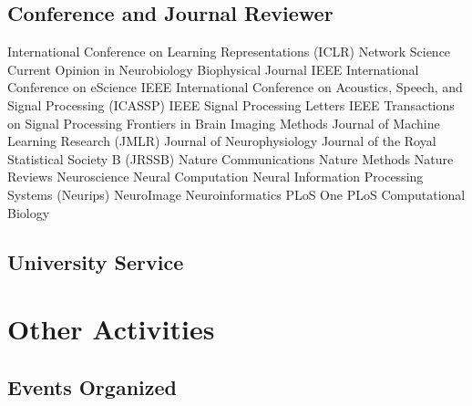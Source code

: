 \documentclass[10pt,colorlinks=true,urlcolor=blue]{moderncv}
\begin{document}
\subsection{Conference and Journal Reviewer}


\cventry {} {International Conference on Learning Representations (ICLR)} {}{}{}{}
\cventry {} {Network Science} {}{}{}{}
\cventry {} {Current Opinion in Neurobiology} {}{}{}{}
\cventry {} {Biophysical Journal} {}{}{}{}
\cventry {} {IEEE International Conference on eScience} {}{}{}{}
\cventry {} {IEEE International Conference on Acoustics, Speech, and Signal Processing (ICASSP)}{}{}{}{}
\cventry {} {IEEE Signal Processing Letters} {} {} {} {}
\cventry {} {IEEE Transactions on Signal Processing} {}{}{}{}
\cventry {} {Frontiers in Brain Imaging Methods} {}{}{}{}
\cventry {} {Journal of Machine Learning Research (JMLR)} {}{}{}{}
\cventry {} {Journal of Neurophysiology} {}{}{}{}
\cventry {} {Journal of the Royal Statistical Society B (JRSSB)} {}{}{}{}
\cventry {} {Nature Communications} {}{}{}{}
\cventry {} {Nature Methods} {}{}{}{}
\cventry {} {Nature Reviews Neuroscience} {}{}{}{}
\cventry {} {Neural Computation} {}{}{}{}
\cventry {} {Neural Information Processing Systems (Neurips)} {}{}{}{}
\cventry {} {NeuroImage} {}{}{}{}
\cventry {} {Neuroinformatics} {}{}{}{}
\cventry {} {PLoS One} {}{}{}{}
\cventry {} {PLoS Computational Biology} {}{}{}{}


\subsection{University  Service}



\section{Other Activities}


\subsection{Events Organized}
\end{document}
